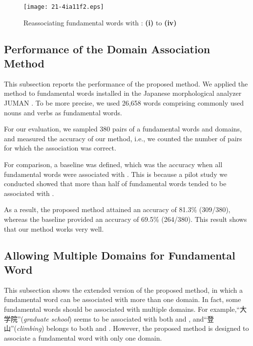 \documentclass[english]{jnlp_1.4_rep}
\newcommand{\dom}[1]{}
\begin{document}
\begin{figure}[t]
\begin{center}
\texttt{[image: 21-4ia11f2.eps]}
\end{center}
\caption{Reassociating fundamental words with \dom{nodomain}: \textbf{(i)} to \textbf{(iv)}}
\label{reassociation-nodomain}
\end{figure}


\subsection{Performance of the Domain Association Method}

This subsection reports the performance of the proposed method.
We applied the method 
to fundamental words installed in the Japanese morphological analyzer JUMAN
\cite{Kurohashi:Nakamura:Matsumoto:Nagao:1994}.
To be more precise, we used 26,658 words comprising commonly used nouns and
verbs as fundamental words.

For our evaluation, we sampled 380 pairs of a fundamental words and domains,
and measured the accuracy of our method, i.e., we counted the number of
pairs for which the 
association was correct.

For comparison, a baseline was defined, which
was the accuracy when all fundamental words were associated with \dom{nodomain}.
This is because a pilot study we conducted showed that more than half of
fundamental words tended to be associated with \dom{nodomain}. 

As a result, the proposed method attained an accuracy of 81.3\%
(309/380), whereas the baseline provided an accuracy of 69.5\% (264/380).
This result shows that our method works very well.


\subsection{Allowing Multiple Domains for Fundamental Word}
\label{allow-multiple}

This subsection shows the extended version of the proposed method, in
which a fundamental word can be associated with more than one domain.
In fact,
some fundamental words should be associated with multiple domains.
For example,“大学院”(\textit{graduate school}) seems to be associated with both
\dom{education} and \dom{science}, and“登山”(\textit{climbing}) belongs to
both \dom{recreation} and \dom{sports}.
However, the proposed method is designed to associate a fundamental word
with only one domain.
\end{document}

